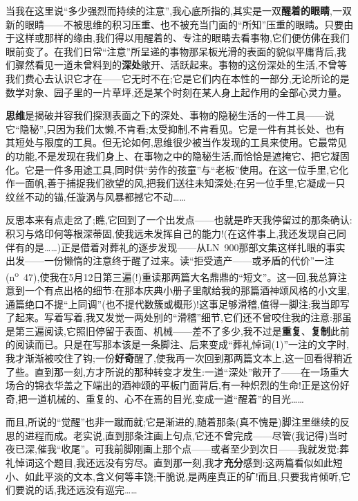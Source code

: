当我在这里说“多少强烈而持续的注意”,我心底所指的,其实是一双\textbf{醒着的眼睛},一双新的眼睛——不被思维的积习压重、也不被充当门面的“所知”压重的眼睛。只要由于这样或那样的缘由,我们得以用醒着的、专注的眼睛去看事物,它们便仿佛在我们眼前变了。在我们日常“注意”所呈递的事物那呆板光滑的表面的貌似平庸背后,我们骤然看见一道未曾料到的\textbf{深处}敞开、活跃起来。事物的这份深处的生活,不曾等我们费心去认识它才在——它无时不在;它是它们内在本性的一部分,无论所论的是数学对象、园子里的一片草坪,还是某个时刻在某人身上起作用的全部心灵力量。

\textbf{思维}是揭破并容我们探测表面之下的深处、事物的隐秘生活的一件工具——说它“隐秘”,只因为我们太懒,不肯看;太受抑制,不肯看见。它是一件有其长处、也有其短处与限度的工具。但无论如何,思维很少被当作发现的工具来使用。它最常见的功能,不是发现在我们身上、在事物之中的隐秘生活,而恰恰是遮掩它、把它凝固化。它是一件多用途工具,同时供“劳作的孩童”与“老板”使用。在这一位手里,它化作一面帆,善于捕捉我们欲望的风,把我们送往未知深处;在另一位手里,它凝成一只纹丝不动的锚,任漩涡与风暴都撼它不动……

反思本来有点走岔了;瞧,它回到了一个出发点——也就是昨天我停留过的那条确认:积习与烙印何等根深蒂固,使我远未发挥\dmark{}自己的能力!(在这件事上,我还发现自己同伴有的是……)正是借着对葬礼的逐步发现——从LN~900那部文集这样扎眼的事实出发——一份懒惰的注意终于醒了过来。读“拒受遗产——或矛盾的代价”一注(n\textsuperscript{o}~47),使我在5月12日第三遍(!)重读那两篇大名鼎鼎的“短文”。这一回,我总算注意到一个有点出格的细节:在那本庆典小册子里献给我的那篇酒神颂风格的小文里,通篇绝口不提“上同调”(也不提代数簇或概形)!这事足够滑稽,值得一脚注;我当即写了起来。写着写着,我又发觉一两处别的“滑稽”细节,它们还不曾咬住我的注意:那虽是第三遍阅读,它照旧停留于表面、机械——差不了多少,我不过是\textbf{重复}、\textbf{复制}此前的阅读而已。只是在写那本该是一条脚注、后来变成“葬礼悼词(1)”一注的文字时,我才渐渐被咬住了钩;一份\textbf{好奇}醒了,使我再一次回到那两篇文本上,这一回看得稍近了些。直到那一刻,方才所说的那种转变才发生:一道“深处”敞开了——在一场重大场合的锦衣华盖之下端出的酒神颂的平板门面背后,有一种炽烈的生命!正是这份好奇,把一道机械的、重复的、心不在焉的目光,变成一道“醒着”的目光……

而且,所说的“觉醒”也非一蹴而就;它是渐进的,随着那条(真不愧是)脚注里继续的反思的进程而成。老实说,直到那条注画上句点,它还不曾完成——尽管(我记得)当时夜已深,催我“收尾”。可我前脚刚画上那个点——或者至少到次日——我就发觉:葬礼悼词这个题目,我还远没有穷尽。\dmark{}直到那一刻,我才\textbf{充分}感到:这两篇看似如此短小、如此平淡的文本,含义何等丰饶;干脆说,是两座真正的矿!而且,只要我肯倾听,它们要说的话,我还远没有巡完……

